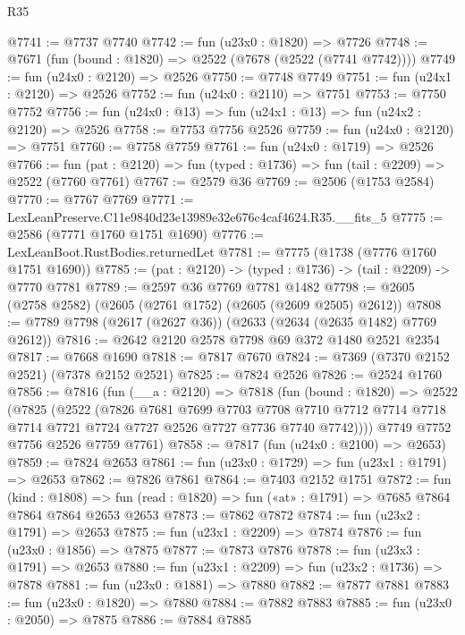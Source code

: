 \begin{lexlean}{R35}
\begin{coremodule}
@7741 := @7737 @7740
@7742 := fun (u23x0 : @1820) => @7726
@7748 := @7671 (fun (bound : @1820) => @2522 (@7678 (@2522 (@7741 @7742))))
@7749 := fun (u24x0 : @2120) => @2526
@7750 := @7748 @7749
@7751 := fun (u24x1 : @2120) => @2526
@7752 := fun (u24x0 : @2110) => @7751
@7753 := @7750 @7752
@7756 := fun (u24x0 : @13) => fun (u24x1 : @13) => fun (u24x2 : @2120) => @2526
@7758 := @7753 @7756 @2526
@7759 := fun (u24x0 : @2120) => @7751
@7760 := @7758 @7759
@7761 := fun (u24x0 : @1719) => @2526
@7766 := fun (pat : @2120) => fun (typed : @1736) => fun (tail : @2209) => @2522 (@7760 @7761)
@7767 := @2579 @36
@7769 := @2506 (@1753 @2584)
@7770 := @7767 @7769
@7771 := LexLeanPreserve.C11e9840d23e13989e32e676c4caf4624.R35.__fits_5
@7775 := @2586 (@7771 @1760 @1751 @1690)
@7776 := LexLeanBoot.RustBodies.returnedLet
@7781 := @7775 (@1738 (@7776 @1760 @1751 @1690))
@7785 := (pat : @2120) -> (typed : @1736) -> (tail : @2209) -> @7770 @7781
@7789 := @2597 @36 @7769 @7781 @1482
@7798 := @2605 (@2758 @2582) (@2605 (@2761 @1752) (@2605 (@2609 @2505) @2612))
@7808 := @7789 @7798 (@2617 (@2627 @36)) (@2633 (@2634 (@2635 @1482) @7769 @2612))
@7816 := @2642 @2120 @2578 @7798 @69 @372 @1480 @2521 @2354
@7817 := @7668 @1690
@7818 := @7817 @7670
@7824 := @7369 (@7370 @2152 @2521) (@7378 @2152 @2521)
@7825 := @7824 @2526
@7826 := @2524 @1760
@7856 := @7816
    (fun (__a : @2120) =>
    @7818
      (fun (bound : @1820) =>
      @2522
        (@7825
          (@2522
            (@7826
              @7681
              @7699
              @7703
              @7708
              @7710
              @7712
              @7714
              @7718
              @7714
              @7721
              @7724
              @7727
              @2526
              @7727
              @7736
              @7740
              @7742))))
      @7749
      @7752
      @7756
      @2526
      @7759
      @7761)
@7858 := @7817 (fun (u24x0 : @2100) => @2653)
@7859 := @7824 @2653
@7861 := fun (u23x0 : @1729) => fun (u23x1 : @1791) => @2653
@7862 := @7826 @7861
@7864 := @7403 @2152 @1751
@7872 := fun (kind : @1808) =>
  fun (read : @1820) => fun («at» : @1791) => @7685 @7864 @7864 @7864 @2653 @2653
@7873 := @7862 @7872
@7874 := fun (u23x2 : @1791) => @2653
@7875 := fun (u23x1 : @2209) => @7874
@7876 := fun (u23x0 : @1856) => @7875
@7877 := @7873 @7876
@7878 := fun (u23x3 : @1791) => @2653
@7880 := fun (u23x1 : @2209) => fun (u23x2 : @1736) => @7878
@7881 := fun (u23x0 : @1881) => @7880
@7882 := @7877 @7881
@7883 := fun (u23x0 : @1820) => @7880
@7884 := @7882 @7883
@7885 := fun (u23x0 : @2050) => @7875
@7886 := @7884 @7885

\end{coremodule}
\end{lexlean}
